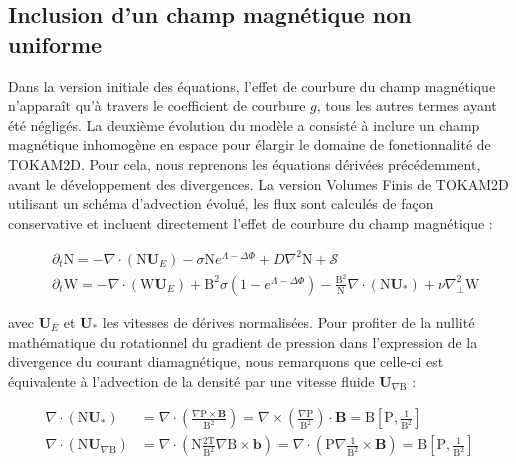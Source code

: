 \begin{refsection}
	\subsection{Inclusion d'un champ magnétique non uniforme}
	
	Dans la version initiale
	des équations, l'effet de courbure du champ magnétique n'apparaît qu'à travers
	le coefficient de courbure $g$, tous les autres termes ayant été négligés.
	La deuxième évolution du modèle a consisté à inclure un champ magnétique
	inhomogène en espace pour élargir le domaine de fonctionnalité de TOKAM2D. Pour
	cela, nous reprenons les équations dérivées précédemment, avant le développement
	des divergences. La version Volumes Finis de TOKAM2D utilisant un schéma
	d'advection évolué, les flux sont calculés de façon conservative et incluent
	directement l'effet de courbure du champ magnétique :
	
\begin{align}
\label{2-eqContinuiteMag}
&\partial_t \text{N}
= - \nabla\cdot\left(\text{N}\mathbf U_{E}\right) -\sigma
\text{N}e^{\Lambda-\Delta\Phi} + D\nabla^2 \text{N} + \mathcal{S}
\\
\label{2-eqCourantMag}
&\partial_{t}\text{W} = 
-\nabla\cdot\left(\text{W}\mathbf U_{E}\right)
+\text{B}^2\sigma\left(1-e^{\Lambda-\Delta\Phi}\right) 
-\frac{\text{B}^2}{\text{N}}\nabla\cdot\left(\text{N}\mathbf U_*\right) 
+\nu\nabla_\perp^2\text{W}
\end{align}

avec $\mathbf U_E$ et $\mathbf U_*$ les vitesses de dérives normalisées.
Pour profiter de la nullité mathématique du rotationnel du gradient de
pression dans l'expression de la divergence du courant
diamagnétique, nous remarquons que celle-ci est équivalente à l'advection de la
densité par une vitesse fluide $\mathbf U_{\nabla\text{B}}$ :

\begin{align}
\nabla\cdot\left(\text{N}\mathbf U_{*}\right)&=
\nabla\cdot\left(\frac{\nabla\text{P}\times\mathbf
B}{\text{B}^2}\right)=
\nabla\times\left(\frac{\nabla\text{P}}{\text{B}^2}\right)\cdot
\mathbf B=\text{B}\left[\text{P},\frac{1}{\text{B}^2}\right]\\
\nabla\cdot\left(\text{N}\mathbf U_{\nabla\text{B}}\right)&=
\nabla\cdot\left(\text{N}\frac{2\text{T}}{\text{B}^2}\nabla\text{B}\times\mathbf
b\right)=
\nabla\cdot\left(\text{P}\nabla\frac{1}{\text{B}^2}\times\mathbf
B\right)=\text{B}\left[\text{P},\frac{1}{\text{B}^2}\right]
\end{align}


\end{refsection}
